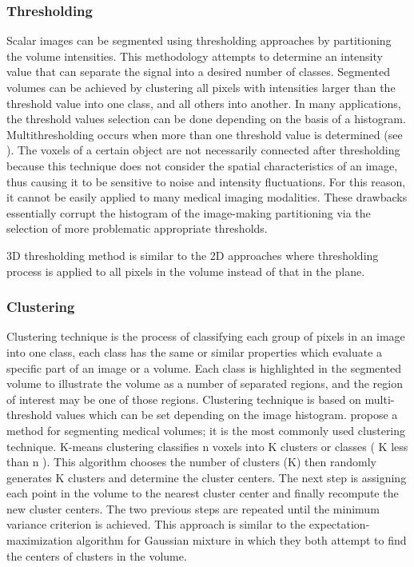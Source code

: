 \subsubsection{ Thresholding }
Scalar images can be segmented using thresholding approaches by partitioning the volume intensities. This methodology attempts to determine an intensity value that can separate the signal into a desired number of classes. Segmented volumes can be achieved by clustering all pixels with intensities larger than the threshold value into one class, and all others into another. In many applications, the threshold values selection can be done depending on the basis of a histogram. Multithresholding occurs when more than one threshold value is determined (see \cite{Sahoo:1988:STT:46072.46079}).
The voxels of a certain object are not necessarily connected after thresholding because this technique does not consider the spatial characteristics of an image, thus causing it to be sensitive to noise and intensity fluctuations. For this reason, it cannot be easily applied to many medical imaging modalities. These drawbacks essentially corrupt the histogram of the image-making partitioning via the selection of more problematic appropriate thresholds.

3D thresholding method is similar to the 2D approaches where thresholding process is applied to all pixels in the volume instead of that in the plane.


\subsubsection{ Clustering }
Clustering technique is the process of classifying each group of pixels in an image into one class, each class has the same or similar properties which evaluate a specific part of an image or a volume. Each class is highlighted in the segmented volume to illustrate the volume as a number of separated regions, and the region of interest may be one of those regions. Clustering technique is based on multi-threshold values which can be set depending on the image histogram. \cite{AMIRA20081954} propose a method for segmenting medical volumes; it is the most commonly used clustering technique.
K-means clustering classifies n voxels into K clusters or classes ( K less than n ). This algorithm chooses the number of clusters (K) then randomly generates K clusters and determine the cluster centers. The next step is assigning each point in the volume to the nearest cluster center and finally recompute the new cluster centers. The two previous steps are repeated until the minimum variance criterion is achieved. This approach is similar to the expectation-maximization algorithm for Gaussian mixture in which they both attempt to find the centers of clusters in the volume.

